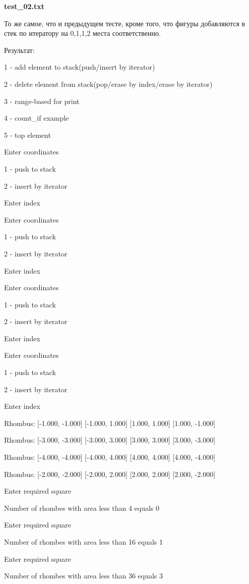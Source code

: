 \documentclass[a4paper, 12pt]{article}
\begin{document}
\vspace{3ex}

\textbf{test\_02.txt} 

То же самое, что и предыдущем тесте, кроме того, что фигуры добавляются в стек по итератору на 0,1,1,2 места соответственно.

Результат:

1 - add element to stack(push/insert by iterator)

2 - delete element from stack(pop/erase by index/erase by iterator)

3 - range-based for print

4 - count\_if example

5 - top element

Enter coordinates

1 - push to stack

2 - insert by iterator

Enter index

Enter coordinates

1 - push to stack


2 - insert by iterator

Enter index

Enter coordinates

1 - push to stack

2 - insert by iterator

Enter index


Enter coordinates

1 - push to stack

2 - insert by iterator

Enter index

Rhombus: [-1.000, -1.000] [-1.000, 1.000] [1.000, 1.000] [1.000, -1.000] 

Rhombus: [-3.000, -3.000] [-3.000, 3.000] [3.000, 3.000] [3.000, -3.000] 

Rhombus: [-4.000, -4.000] [-4.000, 4.000] [4.000, 4.000] [4.000, -4.000] 

Rhombus: [-2.000, -2.000] [-2.000, 2.000] [2.000, 2.000] [2.000, -2.000] 

Enter required square

Number of rhombes with area less than 4 equals 0

Enter required square

Number of rhombes with area less than 16 equals 1

Enter required square

Number of rhombes with area less than 36 equals 3
\end{document}
